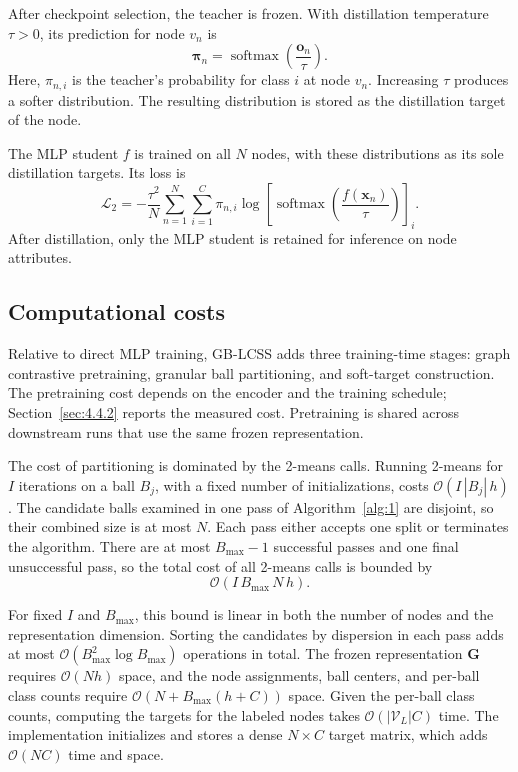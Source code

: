 \documentclass[times,review,10pt]{elsarticle}
\theoremstyle{definition}
\theoremstyle{plain}
\begin{document}
After checkpoint selection, the teacher is frozen. With distillation temperature \(\tau>0\), its prediction for node \(v_n\) is
\begin{equation}\label{eq:20}
\boldsymbol\pi_n=\operatorname{softmax}\left(\frac{\mathbf o_n}{\tau}\right).
\end{equation}
Here, \(\pi_{n,i}\) is the teacher's probability for class \(i\) at node \(v_n\). Increasing \(\tau\) produces a softer distribution. The resulting distribution is stored as the distillation target of the node.

The MLP student \(f\) is trained on all \(N\) nodes, with these distributions as its sole distillation targets. Its loss is
\begin{equation}\label{eq:21}
\mathcal L_2=-\frac{\tau^2}{N}\sum_{n=1}^{N}\sum_{i=1}^C\pi_{n,i}
\log\left[\operatorname{softmax}\left(\frac{f(\mathbf x_n)}{\tau}\right)\right]_i.
\end{equation}
After distillation, only the MLP student is retained for inference on node attributes.

\subsection{Computational costs}\label{sec:3.6}

Relative to direct MLP training, GB-LCSS adds three training-time stages: graph contrastive pretraining, granular ball partitioning, and soft-target construction. The pretraining cost depends on the encoder and the training schedule; Section~\ref{sec:4.4.2} reports the measured cost. Pretraining is shared across downstream runs that use the same frozen representation.


The cost of partitioning is dominated by the 2-means calls. Running 2-means for \(I\) iterations on a ball \(B_j\), with a fixed number of initializations, costs \(\mathcal{O}(I\,|B_j|\,h)\). The candidate balls examined in one pass of Algorithm~\ref{alg:1} are disjoint, so their combined size is at most \(N\). Each pass either accepts one split or terminates the algorithm. There are at most \(B_{\max}-1\) successful passes and one final unsuccessful pass, so the total cost of all 2-means calls is bounded by
\begin{equation}\label{eq:22}
\mathcal{O}(I\,B_{\max}\,N\,h).
\end{equation}

For fixed \(I\) and \(B_{\max}\), this bound is linear in both the number of nodes and the representation dimension. Sorting the candidates by dispersion in each pass adds at most \(\mathcal{O}(B_{\max}^{2}\log B_{\max})\) operations in total. The frozen representation \(\mathbf G\) requires \(\mathcal{O}(Nh)\) space, and the node assignments, ball centers, and per-ball class counts require \(\mathcal{O}(N + B_{\max}(h + C))\) space. Given the per-ball class counts, computing the targets for the labeled nodes takes \(\mathcal{O}(|\mathcal{V}_{L}|C)\) time. The implementation initializes and stores a dense \(N \times C\) target matrix, which adds \(\mathcal{O}(NC)\) time and space.
\end{document}
